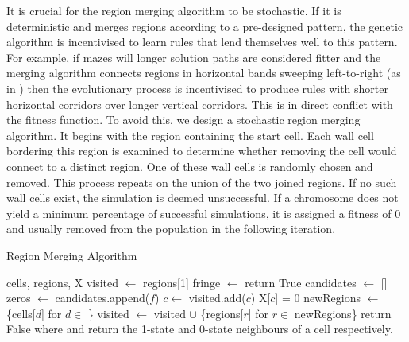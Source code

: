 It is crucial for the region merging algorithm to be stochastic. If it is deterministic and merges regions according to a pre-designed pattern, the genetic algorithm is incentivised to learn rules that lend themselves well to this pattern. For example, if mazes will longer solution paths are considered fitter and the merging algorithm connects regions in horizontal bands sweeping left-to-right (as in \cite{adams2018evolving}) then the evolutionary process is incentivised to produce rules with shorter horizontal corridors over longer vertical corridors. This is in direct conflict with the fitness function. To avoid this, we design a stochastic region merging algorithm. It begins with the region containing the start cell. Each wall cell bordering this region is examined to determine whether removing the cell would connect to a distinct region. One of these wall cells is randomly chosen and removed. This process repeats on the union of the two joined regions. If no such wall cells exist, the simulation is deemed unsuccessful. If a chromosome does not yield a minimum percentage of successful simulations, it is assigned a fitness of 0 and usually removed from the population in the following iteration.\\


\begin{algorithm}
  \caption{Region Merging Algorithm}\label{alg:region-merge}
  \begin{algorithmic}
  \Require cells, regions, X
  \State visited $\gets$ regions[1]
    \State fringe $\gets$ 
        \State return True 
    \EndIf
    \State candidates $\gets$ []
        \State zeros $\gets$ 
            \State candidates.append($f$)
        \EndIf
    \EndFor
        \State $c \gets$ 
        \State visited.add($c$)
        \State X[$c$] = 0
        \State newRegions $\gets$ \{cells[$d$] for $d \in$ \}
        \State visited $\gets$ visited $\cup$ \{regions[$r$] for $r \in$ newRegions\}
    \Else
        \State return False 
    \EndIf
  \EndWhile
  \State
  \State where  and  return the 1-state and 0-state neighbours of a cell respectively.
  \end{algorithmic}
\end{algorithm}


